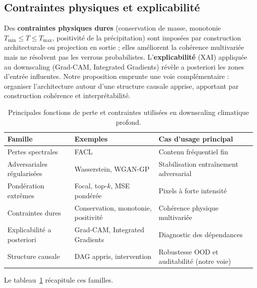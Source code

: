 \subsection{Contraintes physiques et explicabilité}
\label{ssec:soa-physics-xai}

Des \textbf{contraintes physiques dures} (conservation de masse, monotonie $T_{\min} \leq T \leq T_{\max}$, positivité de la précipitation) sont imposées par construction architecturale ou projection en sortie ; elles améliorent la cohérence multivariée mais ne résolvent pas les verrous probabilistes. L'\textbf{explicabilité} (XAI) appliquée au downscaling (Grad-CAM, Integrated Gradients) révèle a posteriori les zones d'entrée influentes. Notre proposition emprunte une voie complémentaire : organiser l'architecture autour d'une structure causale apprise, apportant par construction cohérence et interprétabilité.

\begin{table}[ht]
  \centering
  \footnotesize
  \caption[Fonctions de perte]{Principales fonctions de perte et contraintes utilisées en downscaling climatique profond.}
  \label{tab:pertes}
  \begin{tabular}{p{3cm} p{3.5cm} p{5.5cm}}
    \toprule
    \textbf{Famille} & \textbf{Exemples} & \textbf{Cas d'usage principal} \\
    \midrule
    Pertes spectrales & FACL & Contenu fréquentiel fin\\
    Adversariales régularisées & Wasserstein, WGAN-GP & Stabilisation entraînement adversarial\\
    Pondération extrêmes & Focal, top-$k$, MSE pondérée & Pixels à forte intensité\\
    Contraintes dures & Conservation, monotonie, positivité & Cohérence physique multivariée\\
    Explicabilité a posteriori & Grad-CAM, Integrated Gradients & Diagnostic des dépendances\\
    Structure causale & DAG appris, intervention & Robustesse OOD et auditabilité (notre voie)\\
    \bottomrule
  \end{tabular}
\end{table}

Le tableau~\ref{tab:pertes} récapitule ces familles.

\label{sec:soa-benchmarks}

